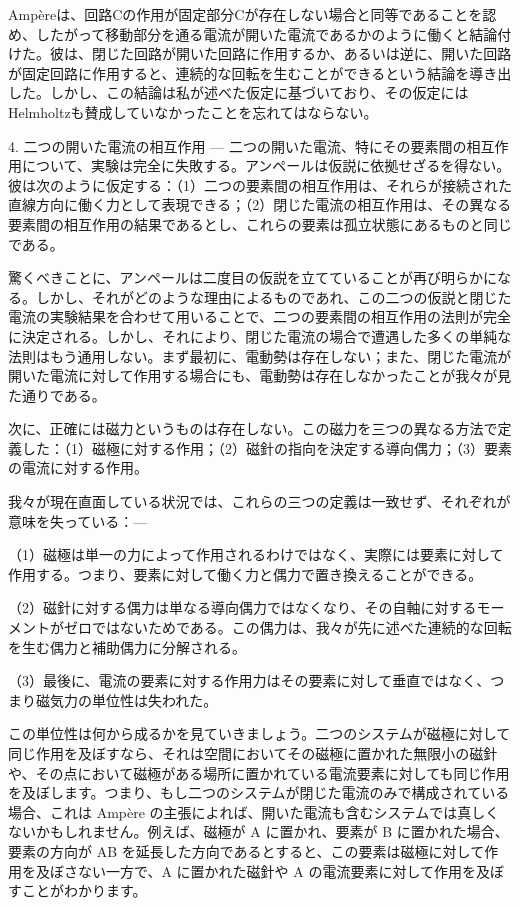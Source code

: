 \documentclass[a4paper,11pt,openany]{ltjsbook}
\begin{document}
Ampèreは、回路Cの作用が固定部分Cが存在しない場合と同等であることを認め、したがって移動部分を通る電流が開いた電流であるかのように働くと結論付けた。彼は、閉じた回路が開いた回路に作用するか、あるいは逆に、開いた回路が固定回路に作用すると、連続的な回転を生むことができるという結論を導き出した。しかし、この結論は私が述べた仮定に基づいており、その仮定にはHelmholtzも賛成していなかったことを忘れてはならない。

4. 二つの開いた電流の相互作用 — 二つの開いた電流、特にその要素間の相互作用について、実験は完全に失敗する。アンペールは仮説に依拠せざるを得ない。彼は次のように仮定する：（1）二つの要素間の相互作用は、それらが接続された直線方向に働く力として表現できる；（2）閉じた電流の相互作用は、その異なる要素間の相互作用の結果であるとし、これらの要素は孤立状態にあるものと同じである。

驚くべきことに、アンペールは二度目の仮説を立てていることが再び明らかになる。しかし、それがどのような理由によるものであれ、この二つの仮説と閉じた電流の実験結果を合わせて用いることで、二つの要素間の相互作用の法則が完全に決定される。しかし、それにより、閉じた電流の場合で遭遇した多くの単純な法則はもう通用しない。まず最初に、電動勢は存在しない；また、閉じた電流が開いた電流に対して作用する場合にも、電動勢は存在しなかったことが我々が見た通りである。


次に、正確には磁力というものは存在しない。この磁力を三つの異なる方法で定義した：（1）磁極に対する作用；（2）磁針の指向を決定する導向偶力；（3）要素の電流に対する作用。

我々が現在直面している状況では、これらの三つの定義は一致せず、それぞれが意味を失っている：—

（1）磁極は単一の力によって作用されるわけではなく、実際には要素に対して作用する。つまり、要素に対して働く力と偶力で置き換えることができる。

（2）磁針に対する偶力は単なる導向偶力ではなくなり、その自軸に対するモーメントがゼロではないためである。この偶力は、我々が先に述べた連続的な回転を生む偶力と補助偶力に分解される。


（3）最後に、電流の要素に対する作用力はその要素に対して垂直ではなく、つまり磁気力の単位性は失われた。

この単位性は何から成るかを見ていきましょう。二つのシステムが磁極に対して同じ作用を及ぼすなら、それは空間においてその磁極に置かれた無限小の磁針や、その点において磁極がある場所に置かれている電流要素に対しても同じ作用を及ぼします。つまり、もし二つのシステムが閉じた電流のみで構成されている場合、これは Ampère の主張によれば、開いた電流も含むシステムでは真しくないかもしれません。例えば、磁極が A に置かれ、要素が B に置かれた場合、要素の方向が AB を延長した方向であるとすると、この要素は磁極に対して作用を及ぼさない一方で、A に置かれた磁針や A の電流要素に対して作用を及ぼすことがわかります。
\end{document}
